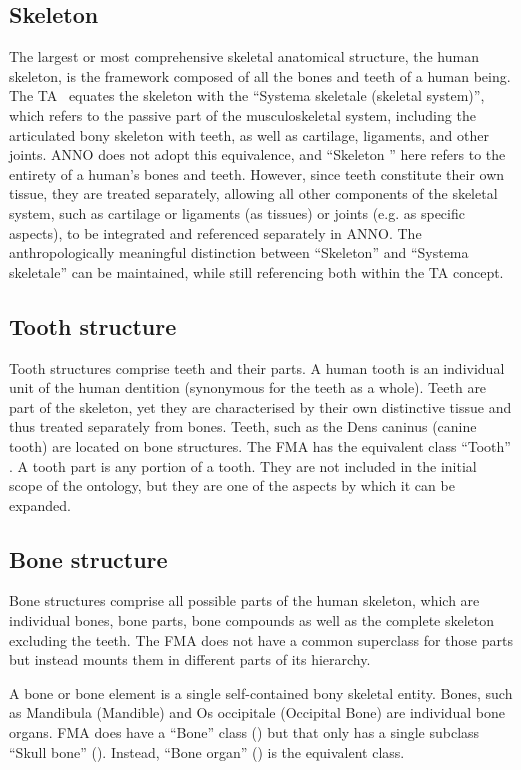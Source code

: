 \documentclass[sw]{iosart2x}
\begin{document}
\subsection{Skeleton}
The largest or most comprehensive skeletal anatomical structure, the human skeleton, is the framework composed of all the bones and teeth of a human being.
The TA~\citep{ta2} equates the skeleton with the \enquote{Systema skeletale (skeletal system)}, which refers to the passive part of the musculoskeletal system, including the articulated bony skeleton with teeth, as well as cartilage, ligaments, and other joints.
ANNO does not adopt this equivalence, and \enquote{Skeleton } here refers to the entirety of a human’s bones and teeth.
However, since teeth constitute their own tissue, they are treated separately, allowing all other components of the skeletal system, such as cartilage or ligaments (as tissues) or joints (e.g. as specific aspects), to be integrated and referenced separately in ANNO.
The anthropologically meaningful distinction between \enquote{Skeleton} and \enquote{Systema skeletale} can be maintained, while still referencing both within the TA concept.

\subsection{Tooth structure}
Tooth structures comprise teeth and their parts.
A human tooth is an individual unit of the human dentition (synonymous for the teeth as a whole).
Teeth are part of the skeleton, yet they are characterised by their own distinctive tissue and thus treated separately from bones.
Teeth, such as the Dens caninus (canine tooth) are located on bone structures.
The FMA has the equivalent class \enquote{Tooth} .
A tooth part is any portion of a tooth.
They are not included in the initial scope of the ontology, but they are one of the aspects by which it can be expanded.

\subsection{Bone structure}
Bone structures comprise all possible parts of the human skeleton, which are individual bones, bone parts, bone compounds as well as the complete skeleton excluding the teeth.
The FMA does not have a common superclass for those parts but instead mounts them in different parts of its hierarchy.

A bone or bone element is a single self-contained bony skeletal entity.
Bones, such as Mandibula (Mandible) and Os occipitale (Occipital Bone) are individual bone organs.
FMA does have a \enquote{Bone} class () but that only has a single subclass \enquote{Skull bone} ().
Instead, \enquote{Bone organ} () is the equivalent class.
\end{document}
